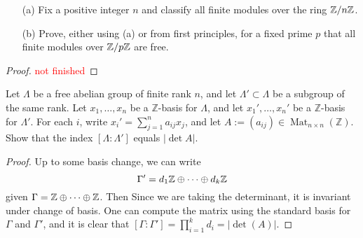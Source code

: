 \begin{prob}[F2018-Q3]
    \phantom{text}
    \begin{itemize}
        \item[(a)] Fix a positive integer \( n \) and classify all finite modules over the ring \( \mathbb{Z}/n\mathbb{Z} \).
        \item[(b)] Prove, either using (a) or from first principles, for a fixed prime \( p \) that all finite modules over \( \mathbb{Z}/p\mathbb{Z} \) are free.
    \end{itemize}
\end{prob}
\begin{proof}
    \textcolor{red}{not finished}
\end{proof}


\begin{prob}[F2017-Q2]
    Let \(\Lambda\) be a free abelian group of finite rank \(n\), and let \(\Lambda' \subset \Lambda\) be a subgroup of the same rank. Let \(x_1, \ldots, x_n\) be a \(\mathbb{Z}\)-basis for \(\Lambda\), and let \(x_1', \ldots, x_n'\) be a \(\mathbb{Z}\)-basis for \(\Lambda'\). For each \(i\), write \(x_i' = \sum_{j=1}^n a_{ij}x_j\), and let \(A := (a_{ij}) \in \operatorname{Mat}_{n \times n}(\mathbb{Z})\). Show that the index \([\Lambda : \Lambda']\) equals \(|\det A|\).
\end{prob}
\begin{proof}
    Up to some basis change, we can write 
    \begin{equation*}
        \Gamma'=d_1\mathbb{Z}\oplus\dots\oplus d_k\mathbb{Z}
    \end{equation*}
    given $\Gamma=\mathbb{Z}\oplus\dots\oplus\mathbb{Z}$. Then Since we are taking the determinant, it is invariant under change of basis. One can compute the matrix using the standard basis for $\Gamma$ and $\Gamma'$, and it is clear that $[\Gamma:\Gamma']=\prod_{i=1}^kd_i=|\det(A)|$.
\end{proof}


